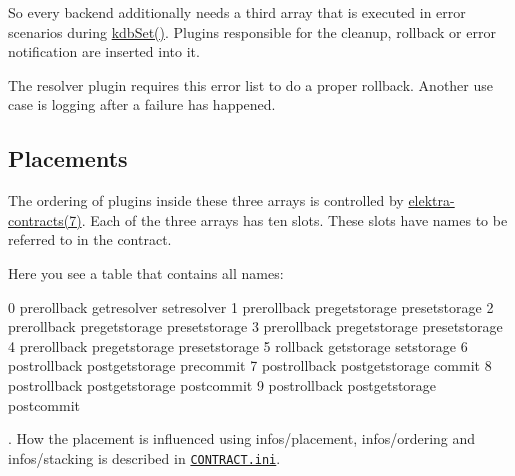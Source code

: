 So every backend additionally needs a third array that is executed in error scenarios during {\ttfamily \hyperlink{group__kdb_ga11436b058408f83d303ca5e996832bcf}{kdb\+Set()}}. Plugins responsible for the cleanup, rollback or error notification are inserted into it.

The resolver plugin requires this error list to do a proper rollback. Another use case is logging after a failure has happened.

\subsection*{Placements}

The ordering of plugins inside these three arrays is controlled by \hyperlink{doc_help_elektra-contracts_md}{elektra-\/contracts(7)}. Each of the three arrays has ten slots. These slots have names to be referred to in the contract.

Here you see a table that contains all names\+: \begin{DoxyVerb}0     prerollback       getresolver         setresolver
1     prerollback       pregetstorage      presetstorage
2     prerollback       pregetstorage      presetstorage
3     prerollback       pregetstorage      presetstorage
4     prerollback       pregetstorage      presetstorage
5      rollback            getstorage         setstorage
6    postrollback      postgetstorage      precommit
7    postrollback      postgetstorage         commit
8    postrollback      postgetstorage     postcommit
9    postrollback      postgetstorage     postcommit
\end{DoxyVerb}


. How the placement is influenced using {\ttfamily infos/placement}, {\ttfamily infos/ordering} and {\ttfamily infos/stacking} is described in \href{/home/markus/Projekte/Elektra/current/doc/CONTRACT.ini}{\tt C\+O\+N\+T\+R\+A\+C\+T.\+ini}. 
